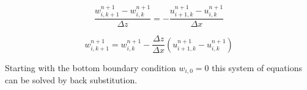 \documentclass[12pt]{article}
\begin{document}
\begin{equation*}
\frac{w_{i,k+1}^{n+1} - w_{i,k}^{n+1}}{\Delta z} = - \frac{u_{i+1,k}^{n+1} - u_{i,k}^{n+1}}{\Delta x}
\end{equation*}

\begin{equation*}
w_{i,k+1}^{n+1} = w_{i,k}^{n+1} - \frac{\Delta z}{\Delta x} (u_{i+1,k}^{n+1} - u_{i,k}^{n+1})
\end{equation*}

Starting with the bottom boundary condition $w_{i,0} = 0$ this system of equations can be solved by back substitution.

\section{}

\section{}

\section{}
\end{document}
